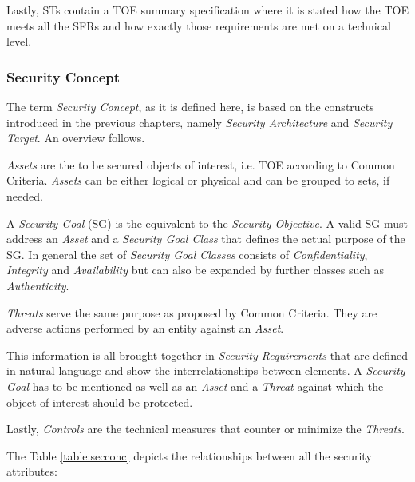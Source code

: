 Lastly, STs contain a TOE summary specification where it is stated how the TOE meets all the SFRs and how exactly those requirements are met on a technical level.

\subsubsection{Security Concept}
\label{subsubsec:secconc}

The term \textit{Security Concept}, as it is defined here, is based on the constructs introduced in the previous chapters, namely \textit{Security Architecture} and \textit{Security Target}. An overview follows. 

\textit{Assets} are the to be secured objects of interest, i.e. TOE according to Common Criteria. \textit{Assets} can be either logical or physical and can be grouped to sets, if needed.

A \textit{Security Goal} (SG) is the equivalent to the \textit{Security Objective}. A valid SG must address an \textit{Asset} and a \textit{Security Goal Class} that defines the actual purpose of the SG. In general the set of \textit{Security Goal Classes} consists of \textit{Confidentiality}, \textit{Integrity} and \textit{Availability} but can also be expanded by further classes such as \textit{Authenticity}.

\textit{Threats} serve the same purpose as proposed by Common Criteria. They are adverse actions performed by an entity against an \textit{Asset}. 

This information is all brought together in \textit{Security Requirements} that are defined in natural language and show the interrelationships between elements. A \textit{Security Goal} has to be mentioned as well as an \textit{Asset} and a \textit{Threat} against which the object of interest should be protected.

Lastly, \textit{Controls} are the technical measures that counter or minimize the \textit{Threats}.     

The Table \ref{table:secconc} depicts the relationships between all the security attributes:

